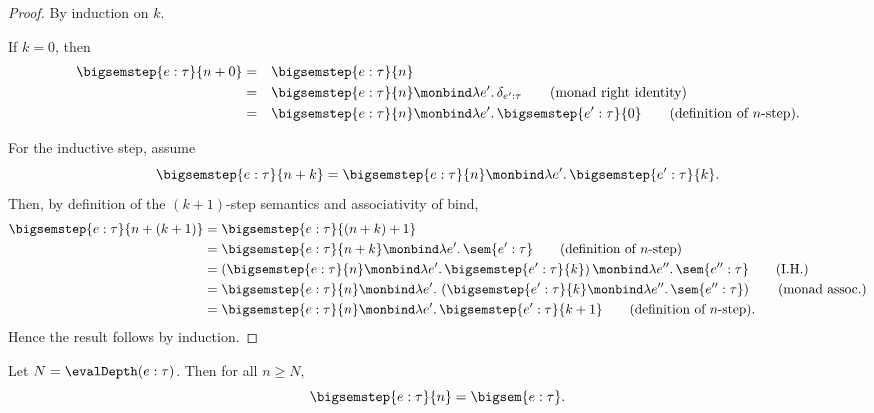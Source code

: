 \begin{proof}
  By induction on $k$.

  If $k=0$, then
  \begin{align*}
    \bigsemstep{e : \tau}{n+0} = &\quad \bigsemstep{e : \tau}{n} \\
    = &\quad \bigsemstep{e : \tau}{n}
    \monbind
    \lambda e'.\,\delta_{e' : \tau} \tag{monad right identity}\\
    = &\quad \bigsemstep{e : \tau}{n}
    \monbind
    \lambda e'.\,\bigsemstep{e' : \tau}{0} \tag{definition of $n$-step}.
  \end{align*}

  For the inductive step, assume
  \[
    \bigsemstep{e : \tau}{n+k}
    =
    \bigsemstep{e : \tau}{n}
    \monbind
    \lambda e'.\,\bigsemstep{e' : \tau}{k}.
  \]
  Then, by definition of the $(k+1)$-step semantics and associativity of bind,
  \begin{align*}
    \bigsemstep{e : \tau}{n+(k+1)}
    &=
    \bigsemstep{e : \tau}{(n+k)+1} \\
    &=
    \bigsemstep{e : \tau}{n+k}
    \monbind
    \lambda e'.\,\sem{e' : \tau} \tag{definition of $n$-step}\\
    &=
    \left(
      \bigsemstep{e : \tau}{n}
      \monbind
      \lambda e'.\,\bigsemstep{e' : \tau}{k}
    \right)
    \monbind
    \lambda e''.\,\sem{e'' : \tau} \tag{I.H.}\\
    &=
    \bigsemstep{e : \tau}{n}
    \monbind
    \lambda e'.\,
      \left(
        \bigsemstep{e' : \tau}{k}
        \monbind
        \lambda e''.\,\sem{e'' : \tau}
      \right) \tag{monad assoc.}\\
    &=
    \bigsemstep{e : \tau}{n}
    \monbind
    \lambda e'.\,\bigsemstep{e' : \tau}{k+1} \tag{definition of $n$-step}.
  \end{align*}
  Hence the result follows by induction.
\end{proof}


\begin{lemma}\label{lem:stabilization}
  Let $N = \evalDepth(e : \tau)$. Then for all $n \geq N$,
  \[
    \bigsemstep{e : \tau}{n} = \bigsem{e : \tau}.
  \]
\end{lemma}

